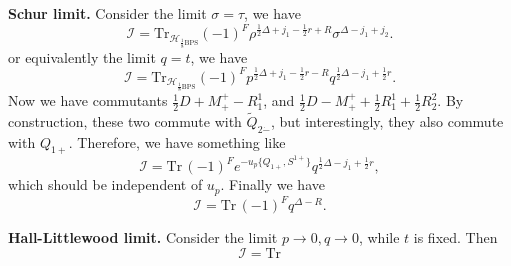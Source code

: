 \documentclass[a4paper,11pt]{article}
\begin{document}
\bigskip
\noindent\textbf{Schur limit.}
Consider the limit $\sigma = \tau$, we have
\begin{equation}
    \mathcal{I} = \mathrm{Tr}_{\mathcal{H}_{\frac{1}{8}\mathrm{BPS}}}(-1)^F \rho^{\frac{1}{2}\Delta + j_1 - \frac{1}{2}r + R} \sigma^{\Delta - j_1  +j_2}.
\end{equation}
or equivalently the limit $q = t$, we have
\begin{equation}
    \mathcal{I} = \mathrm{Tr}_{\mathcal{H}_{\frac{1}{8}\mathrm{BPS}}} (-1)^F p^{\frac{1}{2} \Delta + j_1 - \frac{1}{2} r  - R} q^{\frac{1}{2}\Delta - j_1 + \frac{1}{2}r}.
\end{equation}
Now we have commutants $\frac{1}{2}D + M_+^+ - R^1_1$, and $\frac{1}{2}D - M_+^+ + \frac{1}{2} R^1_1 + \frac{1}{2}R^2_2$. By construction, these two commute with $\widetilde{Q}_{2\dot{-}}$, but interestingly, they also commute with $Q_{1+}$.
Therefore, we have something like
\begin{equation}
    \mathcal{I} = \mathrm{Tr}\, (-1)^F e^{- u_p \{Q_{1+}, S^{1+}\}} q^{\frac{1}{2}\Delta - j_1 + \frac{1}{2} r},
\end{equation}
which should be independent of $u_p$. Finally we have
\begin{equation}
    \mathcal{I} = \mathrm{Tr}\, (-1)^F q^{\Delta - R}.
\end{equation}


\bigskip
\noindent\textbf{Hall-Littlewood limit.} Consider the limit $p \to 0, q\to 0$, while $t$ is fixed. Then
\begin{equation}
    \mathcal{I} = \mathrm{Tr}_{\mathcal{}}
\end{equation}















\end{document}
